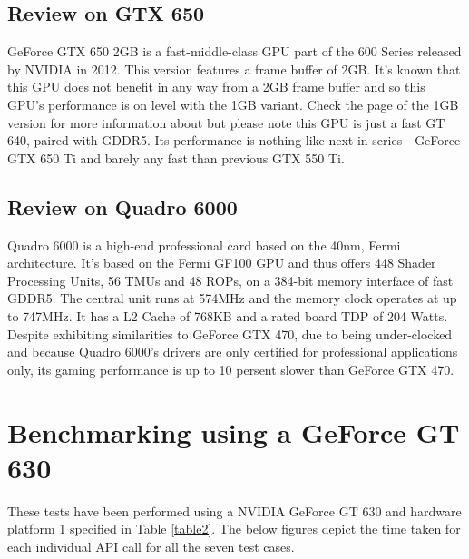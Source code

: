 \documentclass[paper=a4, fontsize=11pt]{scrartcl}
\numberwithin{equation}{section}		%
\numberwithin{figure}{section}			%
\numberwithin{table}{section}				%
\begin{document}
\subsection{Review on GTX 650}
GeForce GTX 650 2GB is a fast-middle-class GPU part of the 600 Series released by NVIDIA in 2012.
This version features a frame buffer of 2GB. It's known that this GPU does not benefit in any way from a 2GB frame buffer and so this GPU's performance is on level with the 1GB variant. Check the page of the 1GB version for more information about but please note this GPU is just a fast GT 640, paired with GDDR5. Its performance is nothing like next in series - GeForce GTX 650 Ti and barely any fast than previous GTX 550 Ti.

\subsection{Review on Quadro 6000}
Quadro 6000 is a high-end professional card based on the 40nm, Fermi architecture. It's based on the Fermi GF100 GPU and thus offers 448 Shader Processing Units, 56 TMUs and 48 ROPs, on a 384-bit memory interface of fast GDDR5. The central unit runs at 574MHz and the memory clock operates at up to 747MHz. It has a L2 Cache of 768KB and a rated board TDP of 204 Watts. 
Despite exhibiting similarities to GeForce GTX 470, due to being under-clocked and because Quadro 6000's drivers are only certified for professional applications only, its gaming performance is up to 10 persent slower than GeForce GTX 470.

\newpage
\section{Benchmarking using a GeForce GT 630}
These tests have been performed using a NVIDIA GeForce GT 630 and hardware platform 1 specified in Table \ref{table2}. The below figures depict the time taken for each individual API call for all the seven test cases.
\end{document}
